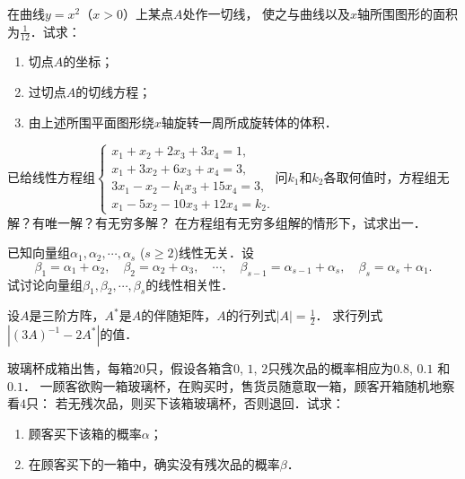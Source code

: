 \documentclass[plain,noanswer,medmath]{../../template/jnuexam}
\begin{document}

\begin{problem}
在曲线$y = x^2$（$x > 0$）上某点$A$处作一切线，
使之与曲线以及$x$轴所围图形的面积为$\frac{1}{12}$．试求：
\begin{enumerate}
\item 切点$A$的坐标；
\item 过切点$A$的切线方程；
\item 由上述所围平面图形绕$x$轴旋转一周所成旋转体的体积．
\end{enumerate}
\end{problem}



\begin{problem}
已给线性方程组$\begin{cases}
  x_1 + x_2 + 2x_3 + 3x_4 = 1, \\
  x_1 + 3x_2 + 6x_3 + x_4 = 3, \\
  3x_1 - x_2 - k_1x_3 + 15x_4 = 3, \\
  x_1 - 5x_2 - 10x_3 + 12x_4 = k_2.
\end{cases}$问$k_1$和$k_2$各取何值时，方程组无解？有唯一解？有无穷多解？
在方程组有无穷多组解的情形下，试求出一．
\end{problem}



\begin{problem}
已知向量组$\alpha_1,\alpha_2, \cdots ,\alpha_s$ ($s \ge 2$)线性无关．设
$$\beta_1 = \alpha_1 + \alpha_2,\quad \beta_2 = \alpha_2 + \alpha_3,\quad \cdots,\quad
  \beta_{s - 1} = \alpha_{s - 1} + \alpha_s,\quad \beta_s = \alpha_s + \alpha_1.$$
试讨论向量组$\beta_1,\beta_2, \cdots ,\beta_s$的线性相关性．
\end{problem}



\begin{problem}
设$A$是三阶方阵，$A^*$是$A$的伴随矩阵，$A$的行列式$|A| = \frac{1}{2}$．
求行列式$\left|(3A)^{-1} - 2A^*\right|$的值．
\end{problem}



\begin{problem}
玻璃杯成箱出售，每箱$20$只，假设各箱含$0$, $1$, $2$只残次品的概率相应为$0.8$, $0.1$ 和$0.1$．
一顾客欲购一箱玻璃杯，在购买时，售货员随意取一箱，顾客开箱随机地察看$4$只：
若无残次品，则买下该箱玻璃杯，否则退回．试求：
\begin{enumerate}
\item 顾客买下该箱的概率$\alpha$；
\item 在顾客买下的一箱中，确实没有残次品的概率$\beta$．
\end{enumerate}
\end{problem}
\end{document}

